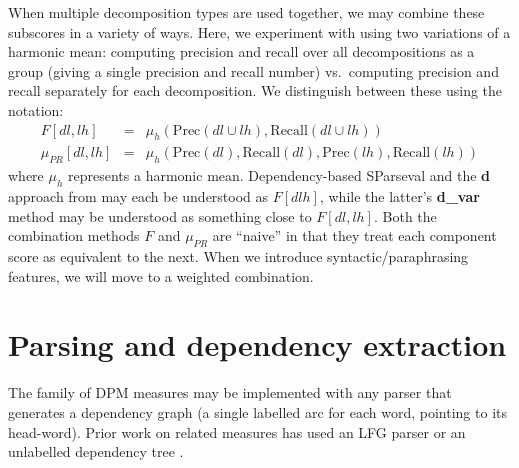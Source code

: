 \documentclass{kluwer}    %
\newcommand{\precision}[1]{\ensuremath{\textrm{Prec}\left(#1\right)}}
\newcommand{\recall}[1]{\ensuremath{\textrm{Recall}\left(#1\right)}}
\begin{document}
\begin{article}


When multiple decomposition types are used together, we may combine
these subscores in a variety of ways. Here, we experiment with using
two variations of a harmonic mean:
computing precision and recall over all
decompositions as a group (giving a single precision and recall number)
vs.\ computing precision and recall separately for each decomposition.
We distinguish between these using the notation:
\begin{eqnarray}
  \label{eq:fprmeans}
  F[dl,lh] & = &
  \mu_h \left( \precision{dl \cup lh},
    \recall{dl \cup lh} \right) \\
  \mu_{PR}[dl,lh]  & = & \mu_h \left( \precision{dl},
    \recall{dl}, \precision{lh}, \recall{lh} \right)    
\end{eqnarray}
where $\mu_h$ represents a harmonic mean.
Dependency-based SParseval  
and the \textbf{d} approach from
 may each be understood as
$F[dlh]$, while the latter's \textbf{d\_var} method may be understood
as something close to $F[dl,lh]$.
%
Both the combination methods $F$ and
$\mu_{PR}$ are ``naive'' in that they treat each component
score as equivalent to the next.  When we introduce syntactic/paraphrasing
features, we will move to a weighted combination.



\section{Parsing and dependency extraction}
\label{sec:paradigm}

The family of DPM measures may be implemented with
any parser that generates a dependency graph (a single labelled arc
for each word, pointing to its head-word). Prior work
\cite{owczarzak07evaluatingmt} on related
measures has used an LFG parser \cite{cahill04lfg} or
an unlabelled dependency tree \cite{liu05syntaxformteval}. 


\end{article}
\end{document}
